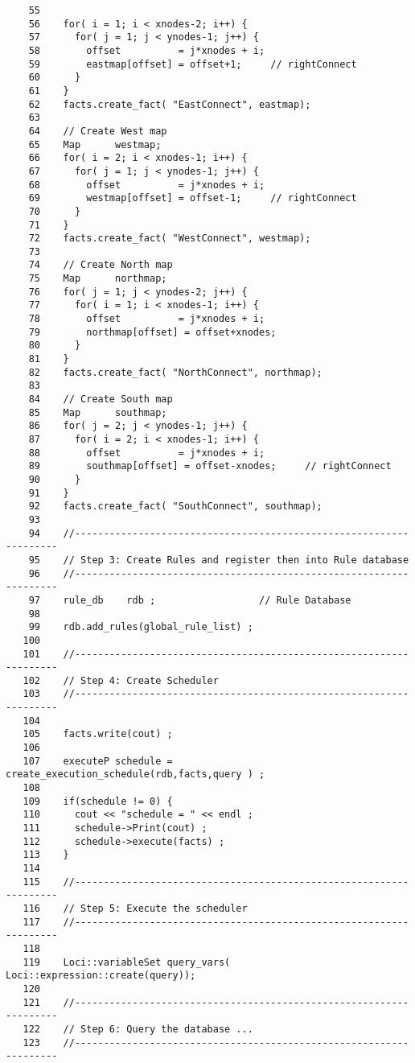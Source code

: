 \begin{verbatim}
    55
    56    for( i = 1; i < xnodes-2; i++) {
    57      for( j = 1; j < ynodes-1; j++) {
    58        offset          = j*xnodes + i;
    59        eastmap[offset] = offset+1;     // rightConnect
    60      }
    61    }
    62    facts.create_fact( "EastConnect", eastmap);
    63
    64    // Create West map
    65    Map      westmap;
    66    for( i = 2; i < xnodes-1; i++) {
    67      for( j = 1; j < ynodes-1; j++) {
    68        offset          = j*xnodes + i;
    69        westmap[offset] = offset-1;     // rightConnect
    70      }
    71    }
    72    facts.create_fact( "WestConnect", westmap);
    73
    74    // Create North map
    75    Map      northmap;
    76    for( j = 1; j < ynodes-2; j++) {
    77      for( i = 1; i < xnodes-1; i++) {
    78        offset          = j*xnodes + i;
    79        northmap[offset] = offset+xnodes;
    80      }
    81    }
    82    facts.create_fact( "NorthConnect", northmap);
    83
    84    // Create South map
    85    Map      southmap;
    86    for( j = 2; j < ynodes-1; j++) {
    87      for( i = 2; i < xnodes-1; i++) {
    88        offset          = j*xnodes + i;
    89        southmap[offset] = offset-xnodes;     // rightConnect
    90      }
    91    }
    92    facts.create_fact( "SouthConnect", southmap);
    93
    94    //-------------------------------------------------------------------
    95    // Step 3: Create Rules and register then into Rule database
    96    //-------------------------------------------------------------------
    97    rule_db    rdb ;                  // Rule Database
    98
    99    rdb.add_rules(global_rule_list) ;
   100
   101    //-------------------------------------------------------------------
   102    // Step 4: Create Scheduler
   103    //-------------------------------------------------------------------
   104
   105    facts.write(cout) ;
   106
   107    executeP schedule = create_execution_schedule(rdb,facts,query ) ;
   108
   109    if(schedule != 0) {
   110      cout << "schedule = " << endl ;
   111      schedule->Print(cout) ;
   112      schedule->execute(facts) ;
   113    }
   114
   115    //-------------------------------------------------------------------
   116    // Step 5: Execute the scheduler
   117    //-------------------------------------------------------------------
   118
   119    Loci::variableSet query_vars( Loci::expression::create(query));
   120
   121    //-------------------------------------------------------------------
   122    // Step 6: Query the database ...
   123    //-------------------------------------------------------------------

\end{verbatim}
